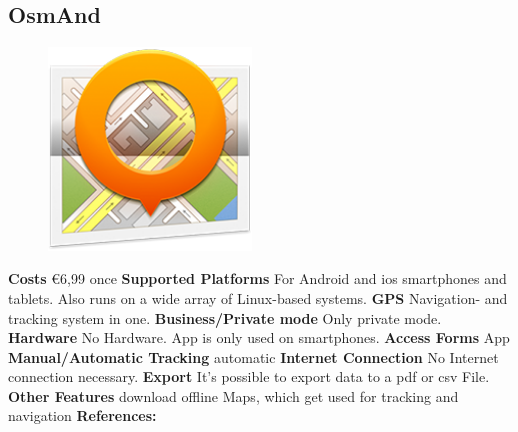 \begin{singlespace}
\section{OsmAnd} 
\begin{figure}
\centering
\includegraphics[width=0.48\textwidth]{bilder/osmand.png}
\end{figure}



\textbf{Costs} \euro 6,99 once\newline\newline
\textbf{Supported Platforms} For Android and \gls{ios} smartphones and tablets. Also runs on a wide array of Linux-based systems.\newline\newline
\textbf{GPS} Navigation- and tracking  system in one.\newline\newline
\textbf{Business/Private mode} Only private mode.\newline\newline
\textbf{Hardware} No Hardware. App is only used on smartphones.\newline\newline
\textbf{Access Forms} App\newline\newline
\textbf{Manual/Automatic Tracking} automatic\newline\newline
\textbf{Internet Connection} No Internet connection necessary.\newline\newline
\textbf{Export} It’s possible to export data to a \gls{pdf} or \gls{csv} File.\newline\newline
\textbf{Other Features} download offline Maps, which get used for tracking and navigation\newline\newline
\textbf{References:} \cite{osmand}
\newpage


\end{singlespace}
